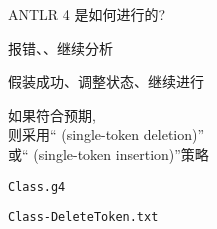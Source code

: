 
\begin{frame}{}
  \begin{center}
    \Large{ANTLR 4 是如何进行的?}
  \end{center}
\end{frame}

\begin{frame}{}
  \begin{center}

    \vspace{0.20cm}
    报错、、继续分析
  \end{center}
\end{frame}

\begin{frame}{}

  \vspace{0.30cm}
  \begin{center}
     假装成功、调整状态、继续进行
  \end{center}
\end{frame}


\begin{frame}{}
  \begin{center}

    如果符合预期, \\[8pt]
    则采用`` (single-token deletion)'' \\[8pt]
    或`` (single-token insertion)''策略

    \vspace{1.00cm}
    \texttt{Class.g4}
  \end{center}
\end{frame}

\begin{frame}{}
  \begin{center}
    \texttt{Class-DeleteToken.txt}

    \vspace{0.30cm}
  \end{center}
\end{frame}

